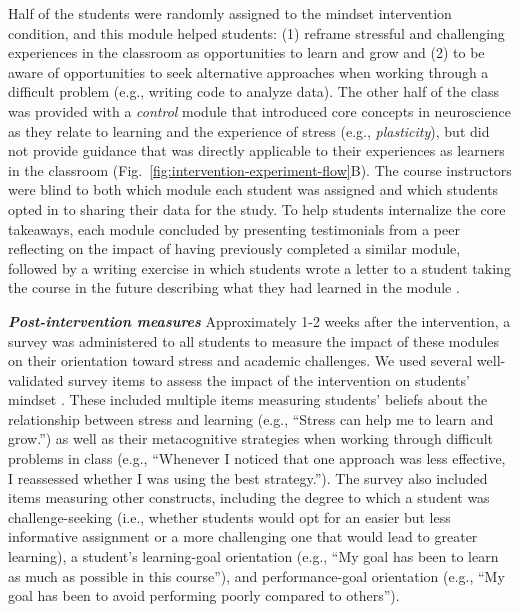 \documentclass[10pt,letterpaper]{article}
\begin{document}
Half of the students were randomly assigned to the mindset intervention condition, and this module helped students: (1) reframe stressful and challenging experiences in the classroom as opportunities to learn and grow and (2) to be aware of opportunities to seek alternative approaches when working through a difficult problem (e.g., writing code to analyze data). 
The other half of the class was provided with a \textit{control} module that introduced core concepts in neuroscience as they relate to learning and the experience of stress (e.g., \textit{plasticity}), but did not provide guidance that was directly applicable to their experiences as learners in the classroom (Fig.~\ref{fig:intervention-experiment-flow}B). 
The course instructors were blind to both which module each student was assigned and which students opted in to sharing their data for the study. 
To help students internalize the core takeaways, each module concluded by presenting testimonials from a peer reflecting on the impact of having previously completed a similar module, followed by a writing exercise in which students wrote a letter to a student taking the course in the future describing what they had learned in the module \cite{bauer2024identity, Chen2020strategic}.

\noindent \textbf{\textit{Post-intervention measures}}
Approximately 1-2 weeks after the intervention, a survey was administered to all students to measure the impact of these modules on their orientation toward stress and academic challenges. 
We used several well-validated survey items to assess the impact of the intervention on students' mindset \cite{yeager2022synergistic, Chen2020strategic, elliot2008measurement}.
These included multiple items measuring students' beliefs about the relationship between stress and learning (e.g., ``Stress can help me to learn and grow.'') as well as their metacognitive strategies when working through difficult problems in class (e.g., ``Whenever I noticed that one approach was less effective, I reassessed whether I was using the best strategy.''). 
The survey also included items measuring other constructs, including the degree to which a student was challenge-seeking (i.e., whether students would opt for an easier but less informative assignment or a more challenging one that would lead to greater learning), a student's learning-goal orientation (e.g., ``My goal has been to learn as much as possible in this course''), and performance-goal orientation (e.g., ``My goal has been to avoid performing poorly compared to others'').
\end{document}
